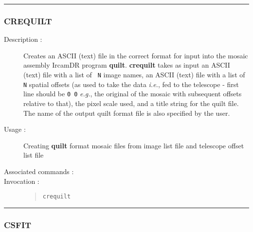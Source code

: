 \hrule
\subsubsection*{\label{CREQUILT}CREQUILT}

\begin{description}

\item[Description :] Creates an ASCII (text) file in the correct format
for input into the mosaic assembly {\sc IrcamDR} program {\bf quilt}.
{\bf crequilt} takes as input an ASCII (text) file with a list of {\tt
N} image names, an ASCII (text) file with a list of {\tt N} spatial
offsets (as used to take the data \emph{i.e.}, fed to the telescope -
first line should be {\tt 0 0} \emph{e.g.}, the original of the mosaic
with subsequent offsets relative to that), the pixel scale used, and a
title string for the quilt file.  The name of the output quilt format
file is also specified by the user.

\item[Usage :] Creating {\bf quilt} format mosaic files from image list
file and telescope offset list file

\item[Associated commands :] {\tt {}}

\item[Invocation :]

\begin{quote}{\tt  crequilt }\end{quote}

\end{description}

\hrule
\subsubsection*{\label{CSFIT}CSFIT}


